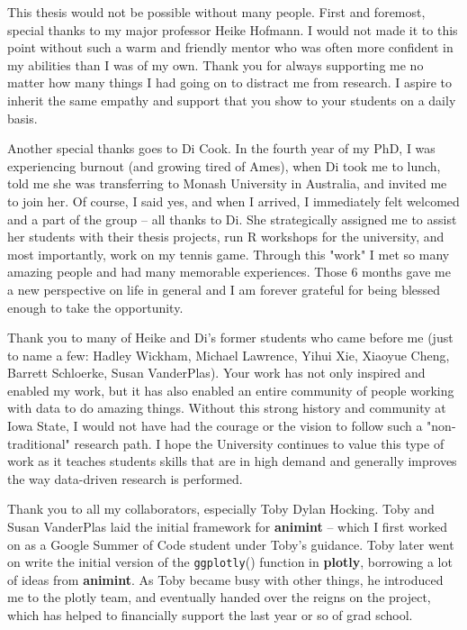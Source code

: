 
This thesis would not be possible without many people. First and foremost, special thanks to my major professor Heike Hofmann. I would not made it to this point without such a warm and friendly mentor who was often more confident in my abilities than I was of my own. Thank you for always supporting me no matter how many things I had going on to distract me from research. I aspire to inherit the same empathy and support that you show to your students on a daily basis. 

Another special thanks goes to Di Cook. In the fourth year of my PhD, I was experiencing burnout (and growing tired of Ames), when Di took me to lunch, told me she was transferring to Monash University in Australia, and invited me to join her. Of course, I said yes, and when I arrived, I immediately felt welcomed and a part of the group -- all thanks to Di. She strategically assigned me to assist her students with their thesis projects, run R workshops for the university, and most importantly, work on my tennis game. Through this "work" I met so many amazing people and had many memorable experiences. Those 6 months gave me a new perspective on life in general and I am forever grateful for being blessed enough to take the opportunity.

Thank you to many of Heike and Di's former students who came before me (just to name a few: Hadley Wickham, Michael Lawrence, Yihui Xie, Xiaoyue Cheng, Barrett Schloerke, Susan VanderPlas). Your work has not only inspired and enabled my work, but it has also enabled an entire community of people working with data to do amazing things. Without this strong history and community at Iowa State, I would not have had the courage or the vision to follow such a "non-traditional" research path. I hope the University continues to value this type of work as it teaches students skills that are in high demand and generally improves the way data-driven research is performed.

Thank you to all my collaborators, especially Toby Dylan Hocking. Toby and Susan VanderPlas laid the initial framework for \textbf{animint} -- which I first worked on as a Google Summer of Code student under Toby's guidance. Toby later went on write the initial version of the \texttt{ggplotly}() function in \textbf{plotly}, borrowing a lot of ideas from \textbf{animint}. As Toby became busy with other things, he introduced me to the plotly team, and eventually handed over the reigns on the project, which has helped to financially support the last year or so of grad school.

